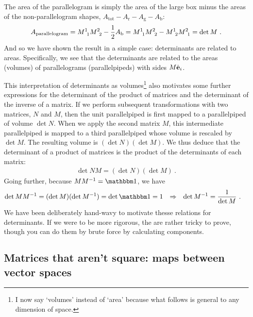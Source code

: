\documentclass[12pt]{article}
\begin{document}
% 
The area of the parallelogram is simply the area of the large box minus the areas of the non-parallelogram shapes, $A_\text{tot}- A_\text{r} - A_\text{g} - A_\text{b}$:
\begin{align}
    A_\text{parallelogram} =  M\aij 11 M\aij 22 - \frac 12 A_\text{b}  = M\aij 11 M\aij 22  - M\aij 12 M\aij 21  = \det M \ .
    \label{eq:det:is:area:parallelogram}
\end{align}
And so we have shown the result in a simple case: determinants are related to areas. Specifically, we see that the determinants are related to the areas (volumes) of parallelograms (parallelpipeds) with sides $M\hat{\mathbf{e}}_i$. 

This interpretation of determinants as volumes\footnote{I now say `volumes' instead of `area' because what follows is general to any dimension of space.} also motivates some further expressions for the determinant of the product of matrices and the determinant of the inverse of a matrix. If we perform subsequent transformations with two matrices, $N$ and $M$, then the unit parallelpiped is first mapped to a parallelpiped of volume $\det N$. When we apply the second matrix $M$, this intermediate parallelpiped is mapped to a third parallelpiped whose volume is rescaled by $\det M$. The resulting volume is $(\det N)(\det M)$. We thus deduce that the determinant of a product of matrices is the product of the determinants of each matrix:
\begin{align}
    \det NM = (\det N)(\det M) \ . 
\end{align}
Going further, because $M M\inv = \one$, we have
\begin{align}
    \det M M\inv &= (\det M)(\det M\inv ) = \det\one = 1 
    & \Rightarrow&
    &
     \det M\inv &= \frac{1}{\det M} \ .
\end{align}
We have been deliberately hand-wavy to motivate thesse relations for determinants. If we were to be more rigorous, the are rather tricky to prove, though you can do them by brute force by calculating components. 



\subsection{Matrices that aren't square: maps between vector spaces}
\end{document}
